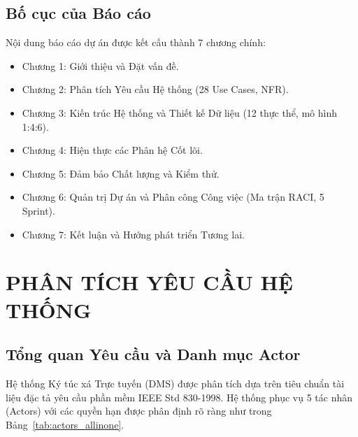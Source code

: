 \documentclass[12pt,a4paper,oneside]{report}
\begin{document}
\section{Bố cục của Báo cáo}
Nội dung báo cáo dự án được kết cấu thành 7 chương chính:
\begin{itemize}
    \item Chương 1: Giới thiệu và Đặt vấn đề.
    \item Chương 2: Phân tích Yêu cầu Hệ thống (28 Use Cases, NFR).
    \item Chương 3: Kiến trúc Hệ thống và Thiết kế Dữ liệu (12 thực thể, mô hình 1:4:6).
    \item Chương 4: Hiện thực các Phân hệ Cốt lõi.
    \item Chương 5: Đảm bảo Chất lượng và Kiểm thử.
    \item Chương 6: Quản trị Dự án và Phân công Công việc (Ma trận RACI, 5 Sprint).
    \item Chương 7: Kết luận và Hướng phát triển Tương lai.
\end{itemize}

\chapter{PHÂN TÍCH YÊU CẦU HỆ THỐNG}
\label{ch:requirements}

\section{Tổng quan Yêu cầu và Danh mục Actor}
Hệ thống Ký túc xá Trực tuyến (DMS) được phân tích dựa trên tiêu chuẩn tài liệu đặc tả yêu cầu phần mềm IEEE Std 830-1998. Hệ thống phục vụ 5 tác nhân (Actors) với các quyền hạn được phân định rõ ràng như trong Bảng~\ref{tab:actors_allinone}.
\end{document}
